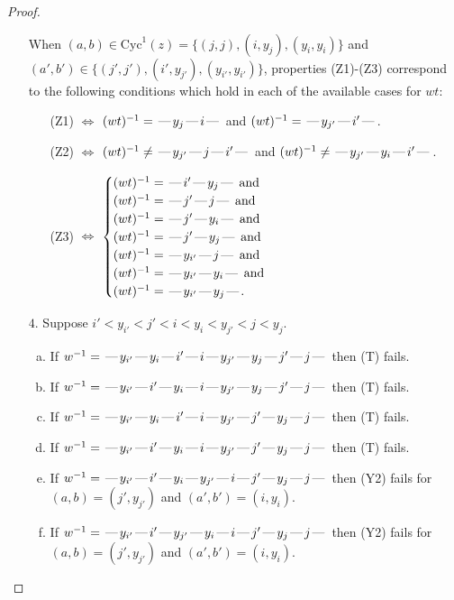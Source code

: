 \documentclass[10pt]{article}
\theoremstyle{definition}
\theoremstyle{definition}
\def\dash{\text{\hspace{0.5mm}---\hspace{0.5mm}}}
\def\Cyc{\mathrm{Cyc}}
\begin{document}
\begin{proof}
\begin{enumerate}
When $(a,b)\in\Cyc^1(z)=\{(j,j),(i,y_j),(y_i,y_i)\}$ and $(a',b')\in\{(j',j'),(i',y_{j'}),(y_{i'},y_{i'})\}$,
properties (Z1)-(Z3) correspond to the following conditions which
hold in each of the available cases for $wt$:
\begin{enumerate}
\item[](Z1) $\Leftrightarrow$ $(wt)^{-1} = \dash y_j \dash i \dash$  and $(wt)^{-1} = \dash y_{j'} \dash i' \dash$.
\item[](Z2) $\Leftrightarrow$ $(wt)^{-1} \neq \dash y_{j'} \dash j \dash i' \dash$  and $(wt)^{-1} \neq \dash y_{j'} \dash y_i \dash i' \dash$.
\item[](Z3) $\Leftrightarrow$ $\begin{cases}\text{$(wt)^{-1} = \dash i' \dash y_j \dash$}\text{ and }\\
\text{$(wt)^{-1} = \dash j' \dash j \dash$}\text{ and }\\
\text{$(wt)^{-1} = \dash j' \dash y_i \dash$}\text{ and }\\
\text{$(wt)^{-1} = \dash j' \dash y_j \dash$}\text{ and }\\
\text{$(wt)^{-1} = \dash y_{i'} \dash j \dash$}\text{ and }\\
\text{$(wt)^{-1} = \dash y_{i'} \dash y_i \dash$}\text{ and }\\
\text{$(wt)^{-1} = \dash y_{i'} \dash y_j \dash$}.\end{cases}$
\end{enumerate}
\item[$4$.] Suppose $i' < y_{i'} < j' < i < y_i < y_{j'} < j < y_j$.
\begin{enumerate}[(a)]
\item If $w^{-1} = \dash y_{i'}\dash y_i\dash i'\dash i\dash y_{j'}\dash y_j\dash j'\dash j\dash $ then (T) fails.
\item If $w^{-1} = \dash y_{i'}\dash i'\dash y_i\dash i\dash y_{j'}\dash y_j\dash j'\dash j\dash $ then (T) fails.
\item If $w^{-1} = \dash y_{i'}\dash y_i\dash i'\dash i\dash y_{j'}\dash j'\dash y_j\dash j\dash $ then (T) fails.
\item If $w^{-1} = \dash y_{i'}\dash i'\dash y_i\dash i\dash y_{j'}\dash j'\dash y_j\dash j\dash $ then (T) fails.
\item If $w^{-1} = \dash y_{i'}\dash i'\dash y_i\dash y_{j'}\dash i\dash j'\dash y_j\dash j\dash $ then (Y2) fails for $(a,b)=(j',y_{j'})$ and $(a',b')=(i,y_i)$.
\item If $w^{-1} = \dash y_{i'}\dash i'\dash y_{j'}\dash y_i\dash i\dash j'\dash y_j\dash j\dash $ then (Y2) fails for $(a,b)=(j',y_{j'})$ and $(a',b')=(i,y_i)$.

\end{enumerate}
\end{enumerate}
\end{proof}
\end{document}
